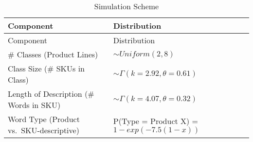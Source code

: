 \documentclass[]{article}
\begin{document}
\begin{longtable}[]{@{}ll@{}}
\caption{Simulation Scheme}\tabularnewline
\toprule
\begin{minipage}[b]{0.47\columnwidth}\raggedright\strut
Component\strut
\end{minipage} & \begin{minipage}[b]{0.48\columnwidth}\raggedright\strut
Distribution\strut
\end{minipage}\tabularnewline
\midrule
\endfirsthead
\toprule
\begin{minipage}[b]{0.47\columnwidth}\raggedright\strut
Component\strut
\end{minipage} & \begin{minipage}[b]{0.48\columnwidth}\raggedright\strut
Distribution\strut
\end{minipage}\tabularnewline
\midrule
\endhead
\begin{minipage}[t]{0.47\columnwidth}\raggedright\strut
\# Classes (Product Lines)\strut
\end{minipage} & \begin{minipage}[t]{0.48\columnwidth}\raggedright\strut
\(\sim Uniform(2, 8)\)\strut
\end{minipage}\tabularnewline
\begin{minipage}[t]{0.47\columnwidth}\raggedright\strut
Class Size (\# SKUs in Class)\strut
\end{minipage} & \begin{minipage}[t]{0.48\columnwidth}\raggedright\strut
\(\sim \Gamma(k = 2.92, \theta = 0.61)\)\strut
\end{minipage}\tabularnewline
\begin{minipage}[t]{0.47\columnwidth}\raggedright\strut
Length of Description (\# Words in SKU)\strut
\end{minipage} & \begin{minipage}[t]{0.48\columnwidth}\raggedright\strut
\(\sim \Gamma(k = 4.07, \theta = 0.32)\)\strut
\end{minipage}\tabularnewline
\begin{minipage}[t]{0.47\columnwidth}\raggedright\strut
Word Type (Product vs.~SKU-descriptive)\strut
\end{minipage} & \begin{minipage}[t]{0.48\columnwidth}\raggedright\strut
P(Type = Product \textbar{} X) = \(1 - exp(-7.5(1-x))\)\strut
\end{minipage}\tabularnewline
\bottomrule
\end{longtable}
\end{document}
